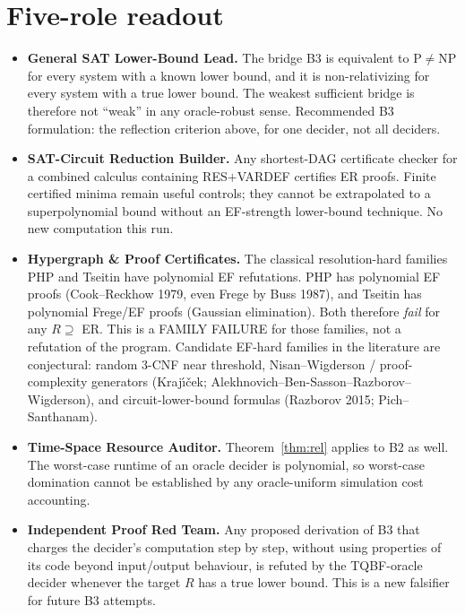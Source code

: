 \documentclass[11pt]{article}
\begin{document}
\section{Five-role readout}
\begin{itemize}
\item \textbf{General SAT Lower-Bound Lead.} The bridge B3 is equivalent to P$\neq$NP for every system with a known lower bound, and it is non-relativizing for every system with a true lower bound. The weakest sufficient bridge is therefore not ``weak'' in any oracle-robust sense. Recommended B3 formulation: the reflection criterion above, for one decider, not all deciders.
\item \textbf{SAT-Circuit Reduction Builder.} Any shortest-DAG certificate checker for a combined calculus containing RES$+$VARDEF certifies ER proofs. Finite certified minima remain useful controls; they cannot be extrapolated to a superpolynomial bound without an EF-strength lower-bound technique. No new computation this run.
\item \textbf{Hypergraph \& Proof Certificates.} The classical resolution-hard families PHP and Tseitin have polynomial EF refutations. PHP has polynomial EF proofs (Cook--Reckhow 1979, even Frege by Buss 1987), and Tseitin has polynomial Frege/EF proofs (Gaussian elimination). Both therefore \emph{fail} for any $R\supseteq$ ER. This is a FAMILY FAILURE for those families, not a refutation of the program. Candidate EF-hard families in the literature are conjectural: random 3-CNF near threshold, Nisan--Wigderson / proof-complexity generators (Kraj\'{\i}\v{c}ek; Alekhnovich--Ben-Sasson--Razborov--Wigderson), and circuit-lower-bound formulas (Razborov 2015; Pich--Santhanam).
\item \textbf{Time-Space Resource Auditor.} Theorem~\ref{thm:rel} applies to B2 as well. The worst-case runtime of an oracle decider is polynomial, so worst-case domination cannot be established by any oracle-uniform simulation cost accounting.
\item \textbf{Independent Proof Red Team.} Any proposed derivation of B3 that charges the decider's computation step by step, without using properties of its code beyond input/output behaviour, is refuted by the TQBF-oracle decider whenever the target $R$ has a true lower bound. This is a new falsifier for future B3 attempts.
\end{itemize}
\end{document}
